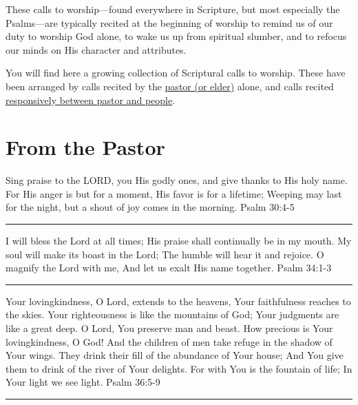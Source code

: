 \documentclass[]{book}
\begin{document}
These calls to worship---found everywhere in Scripture, but most
especially the Psalms---are typically recited at the beginning of
worship to remind us of our duty to worship God alone, to wake us up
from spiritual slumber, and to refocus our minds on His character and
attributes.

You will find here a growing collection of Scriptural calls to worship.
These have been arranged by calls recited by the
\protect\hyperlink{Fromux5cux2520theux5cux2520Pastor}{pastor (or elder)}
alone, and calls recited
\protect\hyperlink{Responsiveux5cux2520Calls}{responsively between
pastor and people}.

\section*{From the Pastor}\label{from-the-pastor}

Sing praise to the LORD, you His godly ones, and give thanks to His holy
name. For His anger is but for a moment, His favor is for a lifetime;
Weeping may last for the night, but a shout of joy comes in the morning.
\textbar{} Psalm 30:4-5

\begin{center}\rule{0.5\linewidth}{\linethickness}\end{center}

I will bless the Lord at all times; His praise shall continually be in
my mouth. My soul will make its boast in the Lord; The humble will hear
it and rejoice. O magnify the Lord with me, And let us exalt His name
together. \textbar{} Psalm 34:1-3

\begin{center}\rule{0.5\linewidth}{\linethickness}\end{center}

Your lovingkindness, O Lord, extends to the heavens, Your faithfulness
reaches to the skies. Your righteousness is like the mountains of God;
Your judgments are like a great deep. O Lord, You preserve man and
beast. How precious is Your lovingkindness, O God! And the children of
men take refuge in the shadow of Your wings. They drink their fill of
the abundance of Your house; And You give them to drink of the river of
Your delights. For with You is the fountain of life; In Your light we
see light. \textbar{} Psalm 36:5-9

\begin{center}\rule{0.5\linewidth}{\linethickness}\end{center}
\end{document}
